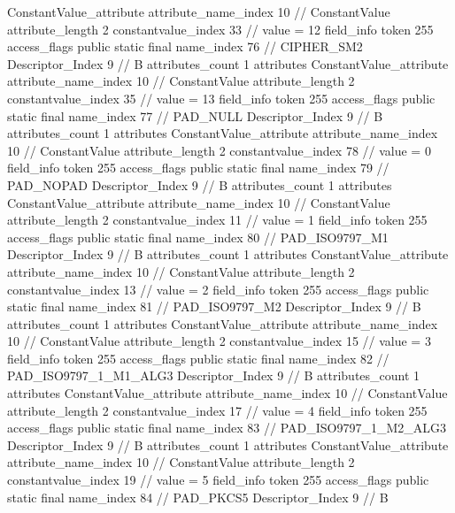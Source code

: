 {{{{{{				ConstantValue_attribute {
					attribute_name_index	10		// ConstantValue
					attribute_length	2
					constantvalue_index	33		// value = 12
				}
				}
			}
			field_info {
				token	255
				access_flags	public static final
				name_index	76		// CIPHER_SM2
				Descriptor_Index	9		// B
				attributes_count	1
				attributes {
				ConstantValue_attribute {
					attribute_name_index	10		// ConstantValue
					attribute_length	2
					constantvalue_index	35		// value = 13
				}
				}
			}
			field_info {
				token	255
				access_flags	public static final
				name_index	77		// PAD_NULL
				Descriptor_Index	9		// B
				attributes_count	1
				attributes {
				ConstantValue_attribute {
					attribute_name_index	10		// ConstantValue
					attribute_length	2
					constantvalue_index	78		// value = 0
				}
				}
			}
			field_info {
				token	255
				access_flags	public static final
				name_index	79		// PAD_NOPAD
				Descriptor_Index	9		// B
				attributes_count	1
				attributes {
				ConstantValue_attribute {
					attribute_name_index	10		// ConstantValue
					attribute_length	2
					constantvalue_index	11		// value = 1
				}
				}
			}
			field_info {
				token	255
				access_flags	public static final
				name_index	80		// PAD_ISO9797_M1
				Descriptor_Index	9		// B
				attributes_count	1
				attributes {
				ConstantValue_attribute {
					attribute_name_index	10		// ConstantValue
					attribute_length	2
					constantvalue_index	13		// value = 2
				}
				}
			}
			field_info {
				token	255
				access_flags	public static final
				name_index	81		// PAD_ISO9797_M2
				Descriptor_Index	9		// B
				attributes_count	1
				attributes {
				ConstantValue_attribute {
					attribute_name_index	10		// ConstantValue
					attribute_length	2
					constantvalue_index	15		// value = 3
				}
				}
			}
			field_info {
				token	255
				access_flags	public static final
				name_index	82		// PAD_ISO9797_1_M1_ALG3
				Descriptor_Index	9		// B
				attributes_count	1
				attributes {
				ConstantValue_attribute {
					attribute_name_index	10		// ConstantValue
					attribute_length	2
					constantvalue_index	17		// value = 4
				}
				}
			}
			field_info {
				token	255
				access_flags	public static final
				name_index	83		// PAD_ISO9797_1_M2_ALG3
				Descriptor_Index	9		// B
				attributes_count	1
				attributes {
				ConstantValue_attribute {
					attribute_name_index	10		// ConstantValue
					attribute_length	2
					constantvalue_index	19		// value = 5
				}
				}
			}
			field_info {
				token	255
				access_flags	public static final
				name_index	84		// PAD_PKCS5
				Descriptor_Index	9		// B
}}}}}
